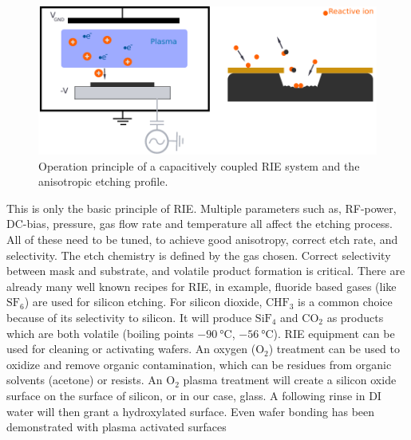 \documentclass[final]{jyflluk}
\begin{document}
\begin{figure}[h]
    \centering
    \includegraphics[width=1.0\textwidth]{images/RIE.pdf}
    \caption{Operation principle of a capacitively coupled RIE system and the anisotropic etching profile.}
    \label{fig:RIE}
\end{figure}


This is only the basic principle of RIE. Multiple parameters such as, RF-power, DC-bias, pressure, gas flow rate and temperature all affect the etching process. All of these need to be tuned, to achieve good anisotropy, correct etch rate, and selectivity. The etch chemistry is defined by the gas chosen. Correct selectivity between mask and substrate, and volatile product formation is critical. There are already many well known recipes for RIE, in example, fluoride based gases (like $\mathrm{SF_6}$) are used for silicon etching. For silicon dioxide, $\mathrm{CHF_3}$ is a common choice because of its selectivity to silicon. It will produce $\mathrm{SiF_4}$ and $\mathrm{CO_2}$ as products which are both volatile (boiling points $\SI{-90}{\celsius}$, $\SI{-56}{\celsius}$).  \cite{franssila2010introduction}
RIE equipment can be used for cleaning or activating wafers. An oxygen ($\mathrm{O_2}$) treatment can be used to oxidize and remove organic contamination, which can be residues from organic solvents (acetone) or resists. An $\mathrm{O_2}$ plasma treatment will create a silicon oxide surface on the surface of silicon, or in our case, glass. A following rinse in DI water will then grant a hydroxylated surface. Even wafer bonding has been demonstrated with plasma activated surfaces \cite{plach2013mechanisms,poulsen2003towards}
\end{document}
